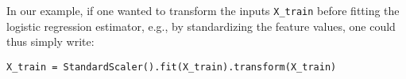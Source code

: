\documentclass{llncs}
\begin{document}
In our example, if one wanted to transform the inputs \texttt{X\_train} before
fitting the logistic regression estimator, e.g., by standardizing the feature values,
one could thus simply write:
\begin{center}
\texttt{X\_train = StandardScaler().fit(X\_train).transform(X\_train)}
\end{center}



\end{document}
